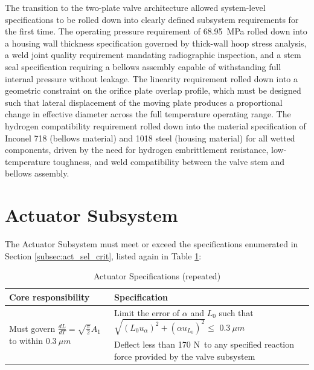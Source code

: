 \documentclass[12pt, letterpaper]{report}%
\newcounter{mycounter}           %
\newcounter{sub}[mycounter]      %
\newcommand{\specPressure}{68.95}%
\newcommand{\FTolValve}{170 N}
\newcommand{\dLdTTolAct}{$0.3\ \mu m$}
\newcommand{\FTolAct}{\FTolValve}
\newcommand{\actSpecs}
{%
    \renewcommand{\arraystretch}{1.4}
    \begin{tabular}{|m{0.45\textwidth}|m{0.5\textwidth}|}
    \hline
    \textbf{Core responsibility} & \textbf{Specification} \\ \hline

    \multirow[c]{2}{0.45\textwidth}{%
        Must govern $\frac{dL}{dT} = \sqrt{\frac{\pi}{2}} A_1$ to within \dLdTTolAct%
    }
    &
    Limit the error of $\alpha$ and $L_0$ such that 
        $\sqrt{ \left( L_0 u_{\alpha} \right) ^2 + \left( \alpha u_{L_0} \right) ^2} \leq$ \dLdTTolAct
    \\ \cline{2-2}
    &
    Deflect less than \FTolAct\ to any specified reaction force provided by the valve subsystem
    \\ \hline

    \end{tabular}

}
\begin{document}
                The transition to the two-plate valve architecture allowed system-level specifications to 
                be rolled down into clearly defined subsystem requirements for the first time. The 
                operating pressure requirement of \specPressure\ MPa rolled down into a housing wall thickness 
                specification governed by thick-wall hoop stress analysis, a weld joint quality requirement 
                mandating radiographic inspection, and a stem seal 
                specification requiring a bellows assembly capable of withstanding full internal pressure 
                without leakage. The linearity requirement rolled down into a geometric constraint on the 
                orifice plate overlap profile, which must be designed such that lateral displacement of 
                the moving plate produces a proportional change in effective diameter across the full 
                temperature operating range. The hydrogen 
                compatibility requirement rolled down into the material specification of Inconel 718 (bellows material) and 1018 steel (housing material) for 
                all wetted components, driven by the need for hydrogen embrittlement resistance, 
                low-temperature toughness, and weld compatibility between the valve stem and bellows 
                assembly.
        
    \section{Actuator Subsystem}
        The Actuator Subsystem must meet or exceed the specifications enumerated in Section \ref{subsec:act_sel_crit}, listed again in Table \ref{tab:act_specs_disc}:

        \begin{table}[H]
            \centering
            \caption{Actuator Specifications (repeated)}
            \actSpecs
            \label{tab:act_specs_disc}
        \end{table}
\end{document}
